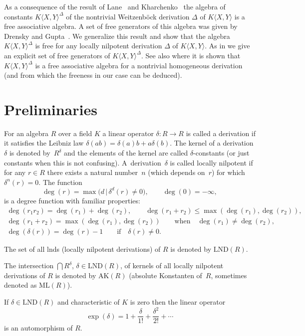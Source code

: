 \documentclass[10pt,a4paper]{amsart}
\numberwithin{equation}{section}
\begin{document}
As a consequence of the result of Lane~\cite{L} and Kharchenko~\cite{Kh} the algebra of constants $K\langle X,Y\rangle^{\Delta}$ of the nontrivial Weitzenb\"ock derivation $\Delta$ of $K\langle X,Y\rangle$ is a free associative algebra. A set of free generators of this algebra was given by Drensky and Gupta~\cite{DG}. We generalize this result and show that the algebra $K\langle X,Y\rangle^{\Delta}$ is free for any locally nilpotent derivation $\Delta$ of $K\langle X,Y\rangle$. As in \cite{DG} we give an explicit set of free generators of $K\langle X,Y\rangle^{\Delta}$. See also \cite{Jo} where it is shown that $K\langle X,Y\rangle^{\Delta}$ is a free associative algebra for a nontrivial homogeneous derivation (and from which the freeness in our case can be deduced).

\section{Preliminaries}\label{section2}

For an algebra $R$ over a field $K$ a linear operator $\delta\colon R\rightarrow R$ is called a derivation if it satisfies the Leibniz law $\delta(ab) = \delta(a)b + a\delta(b)$.
The kernel of a derivation $\delta$ is denoted by~$R^{\delta}$ and the elements of the kernel are called $\delta$-constants (or just constants when this is not confusing).
A~derivation~$\delta$ is called locally nilpotent if for any $r \in R$ there exists a natural number~$n$ (which depends on~$r$) for which $\delta^n(r) = 0$. The function
\[
\deg(r) = \max\big(d\,|\, \delta^d(r) \neq 0\big), \qquad \deg(0) = -\infty,
\]
is a degree function with familiar properties:
\begin{gather*}
\deg(r_1r_2) = \deg(r_1) + \deg(r_2),\qquad \deg(r_1 + r_2) \leq \max(\deg(r_1), \deg(r_2)),\\
\deg(r_1 + r_2) =\max(\deg(r_1), \deg(r_2)) \qquad \text{when} \quad \deg(r_1) \neq \deg(r_2),\\
\deg(\delta(r)) = \deg(r) - 1\qquad \text{if} \quad \delta(r) \neq 0.
\end{gather*}

The set of all lnds (locally nilpotent derivations) of $R$ is denoted by $\text{LND}(R)$.

The intersection $\bigcap R^{\delta}$, $\delta \in \text{LND}(R)$, of kernels of all locally nilpotent derivations of $R$ is denoted by $\text{AK}(R)$ (absolute Konstanten of~$R$, sometimes denoted as $\text{ML}(R)$).

If $\delta \in \text{LND}(R)$ and characteristic of $K$ is zero then the linear operator
\[
\exp(\delta)=1+\frac{\delta}{1!}+\frac{\delta^2}{2!}+\cdots
\]
is an automorphism of $R$.
\end{document}
